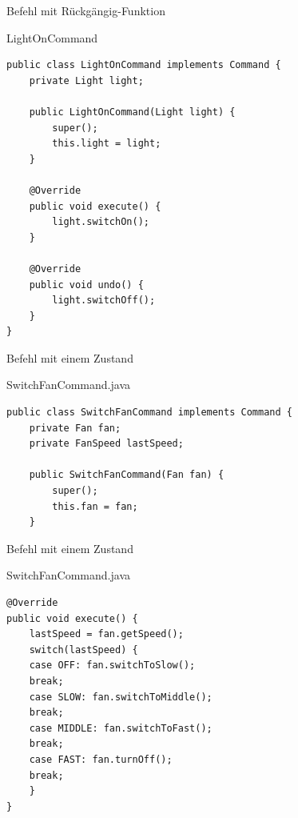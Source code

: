 
\begin{frame}[fragile]{Befehl mit Rückgängig-Funktion}
	\begin{exampleblock}{LightOnCommand}
           \begin{lstlisting}
public class LightOnCommand implements Command {
	private Light light;
	
	public LightOnCommand(Light light) {
		super();
		this.light = light;
	}

	@Override
	public void execute() {
		light.switchOn();
	}

	@Override
	public void undo() {
		light.switchOff();
	}
}            
           \end{lstlisting}
 	\end{exampleblock}
\end{frame}


\begin{frame}[fragile]{Befehl mit einem Zustand}
	\begin{exampleblock}{SwitchFanCommand.java}
 		\begin{lstlisting}
public class SwitchFanCommand implements Command {
	private Fan fan;
	private FanSpeed lastSpeed;
	
	public SwitchFanCommand(Fan fan) {
		super();
		this.fan = fan;
	}
 		\end{lstlisting}
 	\end{exampleblock}
\end{frame}


\begin{frame}[fragile]{Befehl mit einem Zustand}
	\begin{exampleblock}{SwitchFanCommand.java}
 		\begin{lstlisting}
@Override
public void execute() {
    lastSpeed = fan.getSpeed();
    switch(lastSpeed) {
    case OFF: fan.switchToSlow();
    break;
    case SLOW: fan.switchToMiddle();
    break;
    case MIDDLE: fan.switchToFast();
    break;
    case FAST: fan.turnOff();
    break;
    }
}
 		\end{lstlisting}
 	\end{exampleblock}
\end{frame}

